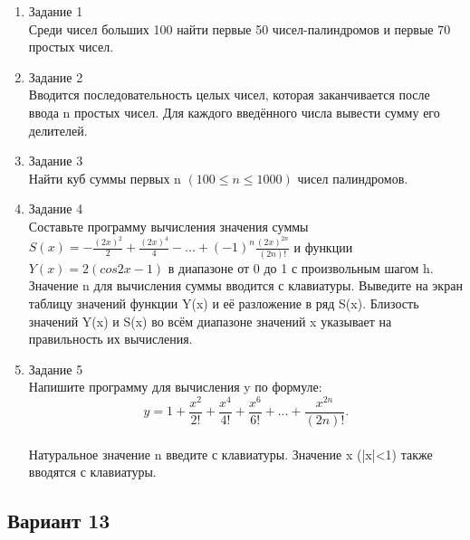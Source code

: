 \documentclass[a4paper]{article}
\begin{document}
	
	\begin{enumerate} 
		\item Задание 1 \\
		Среди чисел больших 100 найти первые 50 чисел-палиндромов и первые 70 простых чисел.\\
		\item Задание 2\\
		Вводится последовательность целых чисел, которая заканчивается после ввода n простых чисел. Для каждого введённого числа вывести сумму его делителей.\\
		\item Задание 3 \\
		Найти куб суммы первых n $(100 \le n \le 1000) $ чисел палиндромов.\\
		\item Задание 4 \\ 
		Составьте программу вычисления значения суммы  $S(x)=-\frac{(2x)^2}{2}+\frac{(2x)^4}{4}-...+(-1)^n\frac{(2x)^{2n}}{(2n)!}$
		и функции $Y(x)=2(cos{2x}-1)$ в диапазоне от 0 до 1
		с произвольным шагом h. Значение n для вычисления суммы вводится с клавиатуры. Выведите на экран таблицу значений функции Y(x) и её разложение в ряд S(x). Близость значений Y(x) и S(x) во всём диапазоне
		значений x указывает на правильность их вычисления.\\
		\item Задание 5 \\
		Напишите программу для вычисления y по формуле:\\
		$$y=1+\frac{x^2}{2!}+\frac{x^4}{4!}+\frac{x^6}{6!}+...+\frac{x^{2n}}{(2n)!}.$$\\
		Натуральное значение n введите с клавиатуры. Значение x (|x|<1) также вводятся с клавиатуры.\\
		
	\end{enumerate}
\newpage	
	\begin{center}
		\subsection*{Вариант 13}
	\end{center}
	
\end{document}

